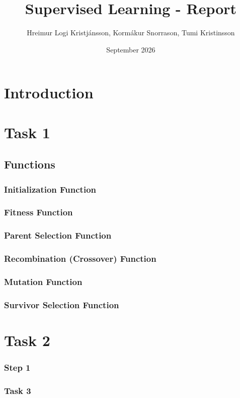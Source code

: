 \documentclass[11pt]{article}
\title{Supervised Learning - Report}
\author{Hreimur Logi Kristjánsson, Kormákur Snorrason, Tumi Kristinsson}
\date{September 2026}
\begin{document}
\maketitle

\section{Introduction}

\section{Task 1}

\subsection{Functions}

\subsubsection{Initialization Function}

\subsubsection{Fitness Function}

\subsubsection{Parent Selection Function}

\subsubsection{Recombination (Crossover) Function}

\subsubsection{Mutation Function}

\subsubsection{Survivor Selection Function}

\section{Task 2}

\subsubsection{Step 1}

\subsubsection{Task 3}
\end{document}
